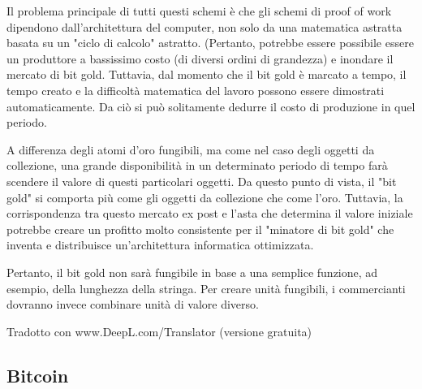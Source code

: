 Il problema principale di tutti questi schemi è che gli schemi di proof of work dipendono dall'architettura del computer, non solo da una matematica astratta basata su un "ciclo di calcolo" astratto. (Pertanto, potrebbe essere possibile essere un produttore a bassissimo costo (di diversi ordini di grandezza) e inondare il mercato di bit gold. Tuttavia, dal momento che il bit gold è marcato a tempo, il tempo creato e la difficoltà matematica del lavoro possono essere dimostrati automaticamente. Da ciò si può solitamente dedurre il costo di produzione in quel periodo.

A differenza degli atomi d'oro fungibili, ma come nel caso degli oggetti da collezione, una grande disponibilità in un determinato periodo di tempo farà scendere il valore di questi particolari oggetti. Da questo punto di vista, il "bit gold" si comporta più come gli oggetti da collezione che come l'oro. Tuttavia, la corrispondenza tra questo mercato ex post e l'asta che determina il valore iniziale potrebbe creare un profitto molto consistente per il "minatore di bit gold" che inventa e distribuisce un'architettura informatica ottimizzata.

Pertanto, il bit gold non sarà fungibile in base a una semplice funzione, ad esempio, della lunghezza della stringa. Per creare unità fungibili, i commercianti dovranno invece combinare unità di valore diverso.

Tradotto con www.DeepL.com/Translator (versione gratuita)

\subsection{Bitcoin}
